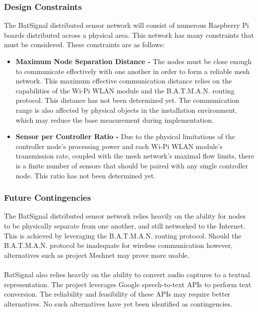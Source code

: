 \documentclass[11pt,a4paper]{article}
\begin{document}
\subsubsection{Design Constraints}
The BatSignal distributed sensor network will consist of numerous Raspberry Pi boards distributed across a physical area. This network has many constraints that must be considered. These constraints are as follows:
\begin{itemize}
	\item{\textbf{Maximum Node Separation Distance -}}
		The nodes must be close enough to communicate effectively with one another in order to form a reliable mesh network. This maximum effective communication distance relies on the capabilities of the Wi-Pi WLAN module and the B.A.T.M.A.N. routing protocol. This distance has not been determined yet.	The communication range is also affected by physical objects in the installation environment, which may reduce the base measurement during implementation.
	\item{\textbf{Sensor per Controller Ratio -}}
		Due to the physical limitations of the controller node's processing power and each Wi-Pi WLAN module's transmission rate, coupled with the mesh network's maximal flow limits, there is a finite number of sensors that should be paired with any single controller node. This ratio has not been determined yet.
\end{itemize}


\subsubsection{Future Contingencies}
The BatSignal distributed sensor network relies heavily on the ability for nodes to be physically separate from one another, and still networked to the Internet. This is achieved by leveraging the B.A.T.M.A.N. routing protocol. Should the B.A.T.M.A.N. protocol be inadequate for wireless communication however, alternatives such as project Meshnet may prove more usable. \\\\
BatSignal also relies heavily on the ability to convert audio captures to a textual representation. The project leverages Google speech-to-text APIs to perform text conversion. The reliability and feasibility of these APIs may require better alternatives. No such alternatives have yet been identified as contingencies.
\end{document}
